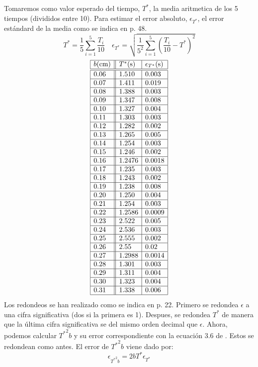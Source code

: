 \documentclass{article}
\begin{document}
\begin{multicols}{2}
Tomaremos como valor esperado del tiempo, $T^*$, la media aritmetica de los 5 tiempos (divididos entre 10). Para estimar el error absoluto, $\epsilon_{T^*}$, el error estándard de la media como se indica en \cite{manual} p. 48.
$$
T^* = \frac{1}{5} \sum_{i=1}^5 \frac{T_i}{10} \quad
\epsilon_{T^*} = \sqrt{\frac{1}{5^2} \sum_{i=1}^5 (\frac{T_i}{10} - T^*)^2}
$$
$$
\begin{array}{|l||l|l|} \hline
  b\text{(cm)} & T^*\text{(s)} & \epsilon_{T^*}\text{(s)} \\ \hline \hline
  0.06 & 1.510 & 0.003  \\ \hline
  0.07 & 1.411 & 0.019  \\ \hline
  0.08 & 1.388 & 0.003  \\ \hline
  0.09 & 1.347 & 0.008  \\ \hline
  0.10 & 1.327 & 0.004  \\ \hline
  0.11 & 1.303 & 0.003  \\ \hline
  0.12 & 1.282 & 0.002  \\ \hline
  0.13 & 1.265 & 0.005  \\ \hline
  0.14 & 1.254 & 0.003  \\ \hline
  0.15 & 1.246 & 0.002  \\ \hline
  0.16 & 1.2476 & 0.0018  \\ \hline
  0.17 & 1.235 & 0.003  \\ \hline
  0.18 & 1.243 & 0.002  \\ \hline
  0.19 & 1.238 & 0.008  \\ \hline
  0.20 & 1.250 & 0.004  \\ \hline
  0.21 & 1.254 & 0.003  \\ \hline
  0.22 & 1.2586 & 0.0009  \\ \hline
  0.23 & 2.522 & 0.005  \\ \hline
  0.24 & 2.536 & 0.003  \\ \hline
  0.25 & 2.555 & 0.002  \\ \hline
  0.26 & 2.55 & 0.02  \\ \hline
  0.27 & 1.2988 & 0.0014  \\ \hline
  0.28 & 1.301 & 0.003  \\ \hline
  0.29 & 1.311 & 0.004  \\ \hline
  0.30 & 1.323 & 0.004  \\ \hline
  0.31 & 1.338 & 0.006  \\ \hline
  \end{array}
$$
Los redondeos se han realizado como se indica en \cite{manual} p. 22. Primero se redondea $\epsilon$ a una cifra significativa (dos si la primera es 1). Despues, se redondea $T^*$ de manera que la última cifra significativa se del mismo orden decimal que $\epsilon$. Ahora, podemos calcular ${T^*}^2b$ y su error correspondiente con la ecuación 3.6 de \cite{manual}. Estos se redondean como antes. El error de ${T^*}^2b$ viene dado por:
$$
\epsilon_{{T^*}^2b} = 2bT^* \epsilon_{T^*}
$$
\begin{tikzpicture}


\end{tikzpicture}
\end{multicols}
\end{document}
